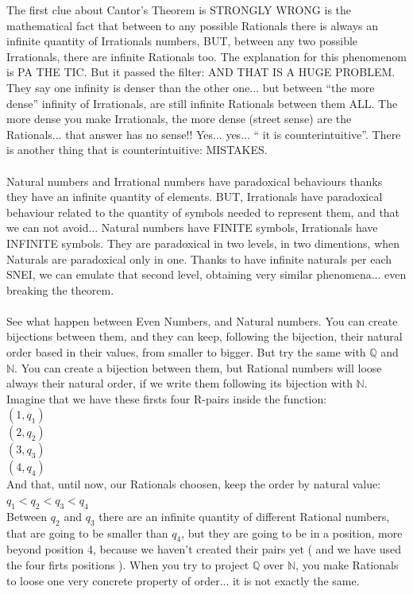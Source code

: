 		\noindent
		The first clue about Cantor's Theorem is STRONGLY WRONG is the mathematical fact that between to any possible Rationals there is always an infinite quantity of Irrationals numbers, BUT, between any two possible Irrationals, there are infinite Rationals too. The explanation for this phenomenom is PA THE TIC. But it passed the filter: AND THAT IS A HUGE PROBLEM. They say one infinity is denser than the other one... but between ``the more dense'' infinity of Irrationals, are still infinite Rationals between them ALL. The more dense you make Irrationals, the more dense (street sense) are the Rationals... that answer has no sense!! Yes... yes... `` it is counterintuitive''. There is another thing that is counterintuitive: MISTAKES. 
		\\\\
		
		\noindent
		Natural numbers and Irrational numbers have paradoxical behaviours thanks they have an infinite quantity of elements. BUT, Irrationals have paradoxical behaviour related to the quantity of symbols needed to represent them, and that we can not avoid... Natural numbers have FINITE symbols, Irrationals have INFINITE symbols. They are paradoxical in two levels, in two dimentions, when Naturals are paradoxical only in one. Thanks to have infinite naturals per each SNEI, we can emulate that second level, obtaining very similar phenomena... even breaking the theorem.
		\\\\
		
		\noindent
		See what happen between Even Numbers, and Natural numbers. You can create bijections between them, and they can keep, following the bijection, their natural order based in their values, from smaller to bigger. But try the same with $\mathbb{Q}$ and $\mathbb{N}$. You can create a bijection between them, but Rational numbers will loose always their natural order, if we write them following its bijection with $\mathbb{N}$. Imagine that we have these firsts four R-pairs inside the function:\\
		$(1, q_{1})$\\
		$(2, q_{2})$\\
		$(3, q_{3})$\\
		$(4, q_{4})$\\
		And that, until now, our Rationals choosen, keep the order by natural value: $q_{1} < q_{2} < q_{3} < q_{4}$\\
		Between $q_{2}$ and $q_{3}$ there are an infinite quantity of different Rational numbers, that are going to be smaller than $q_{4}$, but they are going to be in a position, more beyond position 4, because we haven't created their pairs yet ( and we have used the four firts positions ). When you try to project $\mathbb{Q}$ over $\mathbb{N}$, you make Rationals to loose one very concrete property of order... it is not exactly the same.
		\\\\
		
